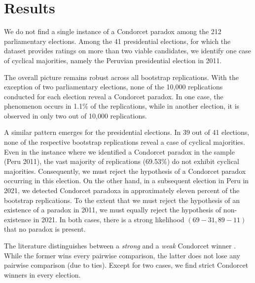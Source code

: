 \documentclass[12pt]{scrartcl}
\newcommand{\nbparliament}{212 }
\newcommand{\nbpresidential}{41 }
\begin{document}
\section{Results} \label{sec.results}
We do not find a single instance of a Condorcet paradox among the \nbparliament parliamentary elections. Among the \nbpresidential presidential elections, for which the dataset provides ratings on more than two viable candidates, we identify one case of cyclical majorities, namely the Peruvian presidential election in 2011. 

The overall picture remains robust across all bootstrap replications. With the exception of two parliamentary elections, none of the 10,000 replications conducted for each election reveal a Condorcet paradox. In one case, the phenomenon occurs in 1.1\% of the replications, while in another election, it is observed in only two out of 10,000 replications.

A similar pattern emerges for the presidential elections. In 
39 %
out of \nbpresidential elections, none of the respective bootstrap replications reveal a case of cyclical majorities. Even in the instance where we identified a Condorcet paradox in the sample (Peru 2011), the vast majority of replications (69.53\%) do not exhibit cyclical majorities. Consequently, we must reject the hypothesis of a Condorcet paradox occurring in this election. On the other hand, in a subsequent election in Peru in 2021, we detected Condorcet paradoxa in approximately eleven percent of the bootstrap replications. To the extent that we must reject the hypothesis of an existence of a paradox in 2011, we must equally reject the hypothesis of non-existence in 2021. In both cases, there is a strong likelihood $(69-31, 89-11)$ that no paradox is present.

The literature distinguishes between a \textit{strong} and a \textit{weak} Condorcet winner \citep{Barbera2023}. While the former wins every pairwise comparison, the latter does not lose any pairwise comparison (due to ties). Except for two cases, we find strict Condorcet winners in every election.
\end{document}
